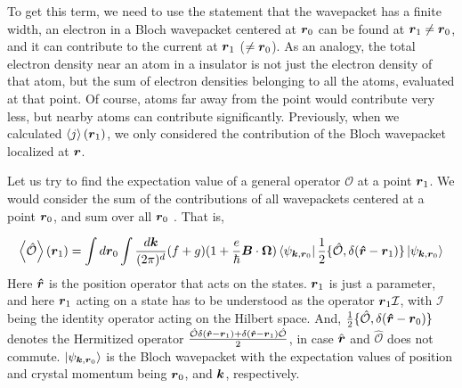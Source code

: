 \documentclass{report}
\renewcommand\vec[1]{\ensuremath\boldsymbol{#1}} %
\begin{document}
To get this term, we need to use the statement that the wavepacket has a finite width, an electron in a Bloch wavepacket centered at $\vec{r}_0$ can be found at $\vec{r}_1 \neq \vec{r}_0$, and it can contribute to the current at $\vec{r}_1$ ($\neq \vec{r}_0$). As an analogy, the total electron density near an atom in a insulator is not just the electron density of that atom, but the sum of electron densities belonging to all the atoms, evaluated at that point. Of course, atoms far away from the point would contribute very less, but nearby atoms can contribute significantly. Previously, when we calculated $\expval{j}(\vec{r}_1)$, we only considered the contribution of the  Bloch wavepacket localized at $\vec{r}$.

Let us try to find the expectation value of a general operator $\mathcal{O}$ at a point $\vec{r}_1$. We would consider the sum of the contributions of all wavepackets centered at a point $\vec{r}_0$, and sum over all $\vec{r}_0$ \cite{XiaoElecPropertiesReview2010}. That is,

$$
	\expval{\hat{\mathcal{O}}}(\vec{r}_1) = \int d\vec{r}_0 \int  \frac{d\vec{k}}{(2\pi)^d} (f+g) (1+\frac{e}{\hbar} \vec{B}\cdot\vec{\Omega})
	\bra{\psi_{\vec{k},\vec{r}_0}} \frac{1}{2}\{\hat{\mathcal{O}}, \delta(\vec{\hat{r}} - \vec{r}_1)\} \ket{\psi_{\vec{k},\vec{r}_0}} 
$$
Here $\vec{\hat{r}}$ is the position operator that acts on the states. $\vec{r}_1$ is just a parameter, and here $\vec{r}_1$ acting on a state has to be understood as the operator $\vec{r}_1 \mathcal{I}$, with $\mathcal{I}$ being the identity operator acting on the Hilbert space. And,
$\frac{1}{2}\{\hat{\mathcal{O}}, \delta(\vec{\hat{r}} - \vec{r}_0)\}$ denotes the Hermitized operator $\frac{\hat{\mathcal{O}}  \delta(\vec{\hat{r}} - \vec{r}_1) + \delta(\vec{\hat{r}} - \vec{r}_1)\hat{\mathcal{O}}  }{2}$, in case $\hat{\vec{r}}$ and $\hat{\mathcal{O}}$ does not commute. $\ket{\psi_{\vec{k},\vec{r}_0}}$ is the Bloch wavepacket with the expectation values of position and crystal momentum being $\vec{r}_0$, and $\vec{k}$, respectively.
\end{document}

